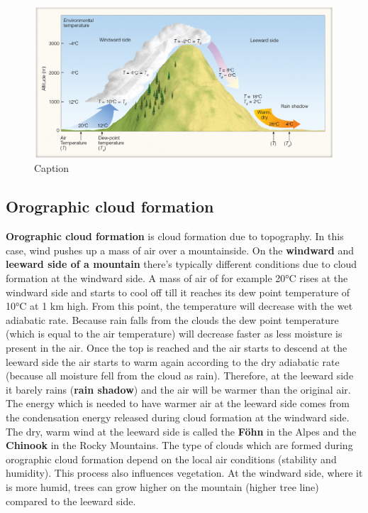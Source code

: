 \documentclass[12pt,oneside]{book}
\begin{document}
\begin{figure}

{\centering \includegraphics[width=0.9\linewidth]{figures/Figure320} 

}

\caption{Caption}\label{fig:Hmeter}
\end{figure}

\subsection{Orographic cloud
formation}\label{orographic-cloud-formation}

\textbf{Orographic cloud formation} is cloud formation due to
topography. In this case, wind pushes up a mass of air over a
mountainside. On the \textbf{windward} and \textbf{leeward side of a
mountain} there's typically different conditions due to cloud formation
at the windward side. A mass of air of for example 20°C rises at the
windward side and starts to cool off till it reaches its dew point
temperature of 10°C at 1 km high. From this point, the temperature will
decrease with the wet adiabatic rate. Because rain falls from the clouds
the dew point temperature (which is equal to the air temperature) will
decrease faster as less moisture is present in the air. Once the top is
reached and the air starts to descend at the leeward side the air starts
to warm again according to the dry adiabatic rate (because all moisture
fell from the cloud as rain). Therefore, at the leeward side it barely
rains (\textbf{rain shadow}) and the air will be warmer than the
original air. The energy which is needed to have warmer air at the
leeward side comes from the condensation energy released during cloud
formation at the windward side. The dry, warm wind at the leeward side
is called the \textbf{Föhn} in the Alpes and the \textbf{Chinook} in the
Rocky Mountains. The type of clouds which are formed during orographic
cloud formation depend on the local air conditions (stability and
humidity). This process also influences vegetation. At the windward
side, where it is more humid, trees can grow higher on the mountain
(higher tree line) compared to the leeward side.
\end{document}
